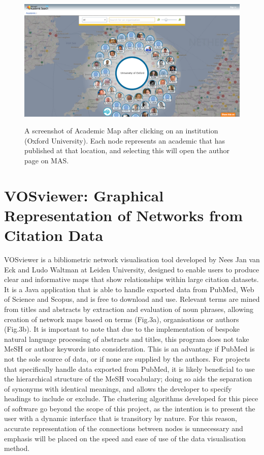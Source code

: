 \documentclass[PROP_AGutteridge_CS.tex]{subfiles}
\begin{document}
\begin{figure}
	\includegraphics[width=\textwidth]{../lib/images/AM}
	\label{fig:AM}
\caption{A screenshot of Academic Map after clicking on an institution (Oxford University). Each node represents an academic that has published at that location, and selecting this will open the author page on MAS.}
\end{figure}


\section{VOSviewer: Graphical Representation of Networks from Citation Data}
VOSviewer is a bibliometric network visualisation tool developed by Nees Jan van Eck and Ludo Waltman at Leiden University, designed to enable users to produce clear and informative maps that show relationships within large citation datasets\cite{eck-waltman2}. It is a Java application that is able to handle exported data from PubMed, Web of Science and Scopus, and is free to download and use. Relevant terms are mined from titles and abstracts by extraction and evaluation of noun phrases\cite{eck-waltman1}, allowing creation of network maps based on terms (Fig.3a), organisations or authors (Fig.3b). It is important to note that due to the implementation of bespoke natural language processing of abstracts and titles, this program does not take MeSH or author keywords into consideration. This is an advantage if PubMed is not the sole source of data, or if none are supplied by the authors. For projects that specifically handle data exported from PubMed, it is likely beneficial to use the hierarchical structure of the MeSH vocabulary; doing so aids the separation of synonyms with identical meanings, and allows the developer to specify headings to include or exclude. The clustering algorithms developed for this piece of software go beyond the scope of this project, as the intention is to present the user with a dynamic interface that is transitory by nature. For this reason, accurate representation of the connections between nodes is unnecessary and emphasis will be placed on the speed and ease of use of the data visualisation method.
\end{document}
